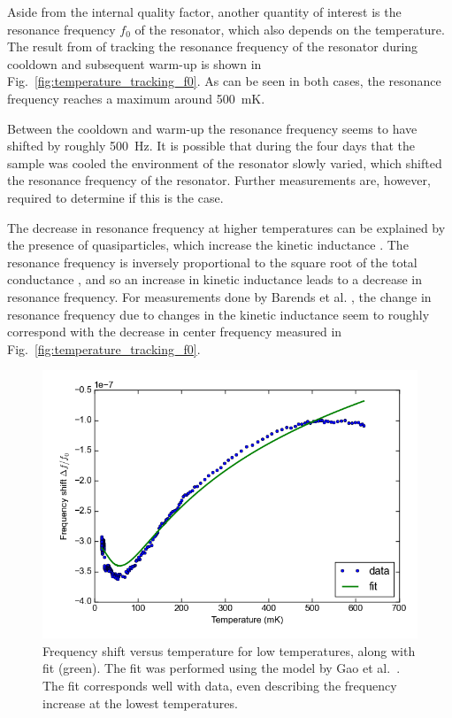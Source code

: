 Aside from the internal quality factor, another quantity of interest is the resonance frequency $f_0$ of the resonator, which also depends on the temperature. The result from of tracking the resonance frequency of the resonator during cooldown and subsequent warm-up is shown in Fig.~\ref{fig:temperature_tracking_f0}. As can be seen in both cases, the resonance frequency reaches a maximum around \SI{500}{\milli \kelvin}.

Between the cooldown and warm-up the resonance frequency seems to have shifted by roughly \SI{500}{Hz}. It is possible that during the four days that the sample was cooled the environment of the resonator slowly varied, which shifted the resonance frequency of the resonator. Further measurements are, however, required to determine if this is the case.

The decrease in resonance frequency at higher temperatures can be explained by the presence of quasiparticles, which increase the kinetic inductance \cite[p91]{Geerlings}. The resonance frequency is inversely proportional to the square root of the total conductance \cite{barends2008contribution}, and so an increase in kinetic inductance leads to a decrease in resonance frequency. For measurements done by Barends et al. \cite{barends2008contribution}, the change in resonance frequency due to changes in the kinetic inductance seem to roughly correspond with the decrease in center frequency measured in Fig.~\ref{fig:temperature_tracking_f0}.

\begin{figure}[h]
    \centering
    \includegraphics[width=.7\textwidth]{Figures/DRIE/Temperature increase tracking - f0 vs T with fit.png}
    \caption{Frequency shift versus temperature for low temperatures, along with fit (green). The fit was performed using the model by Gao et al.~\cite{gao2008experimental}. The fit corresponds well with data, even describing the frequency increase at the lowest temperatures.}
    \label{fig:f0_vs_T_with_fit}
\end{figure}


